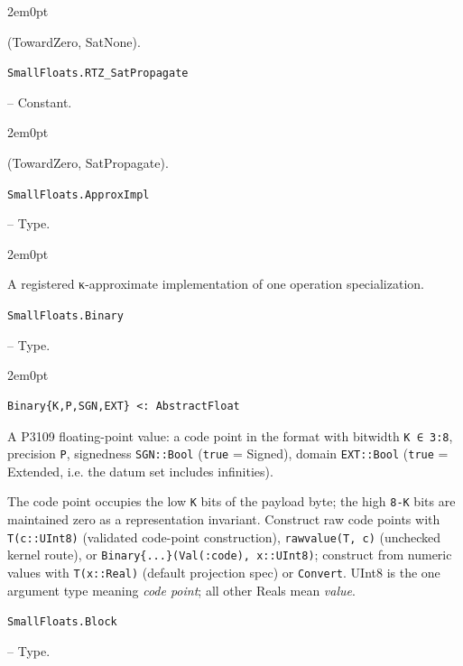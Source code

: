 \begin{adjustwidth}{2em}{0pt}

(TowardZero, SatNone).



\end{adjustwidth}
\hypertarget{11314891540121714893}{\texttt{SmallFloats.RTZ\_SatPropagate}}  -- {Constant.}

\begin{adjustwidth}{2em}{0pt}

(TowardZero, SatPropagate).



\end{adjustwidth}
\hypertarget{9201328443408064130}{\texttt{SmallFloats.ApproxImpl}}  -- {Type.}

\begin{adjustwidth}{2em}{0pt}

A registered κ-approximate implementation of one operation specialization.



\end{adjustwidth}
\hypertarget{8158499324480878091}{\texttt{SmallFloats.Binary}}  -- {Type.}

\begin{adjustwidth}{2em}{0pt}


\begin{verbatim}
Binary{K,P,SGN,EXT} <: AbstractFloat
\end{verbatim}

A P3109 floating-point value: a code point in the format with bitwidth \texttt{K ∈ 3:8}, precision \texttt{P}, signedness \texttt{SGN::Bool} (\texttt{true} = Signed), domain \texttt{EXT::Bool} (\texttt{true} = Extended, i.e. the datum set includes infinities).

The code point occupies the low \texttt{K} bits of the payload byte; the high \texttt{8-K} bits are maintained zero as a representation invariant. Construct raw code points with \texttt{T(c::UInt8)} (validated code-point construction), \texttt{rawvalue(T, c)} (unchecked kernel route), or \texttt{Binary\{...\}(Val(:code), x::UInt8)}; construct from numeric values with \texttt{T(x::Real)} (default projection spec) or \texttt{Convert}. UInt8 is the one argument type meaning \emph{code point}; all other Reals mean \emph{value}.



\end{adjustwidth}
\hypertarget{16566511736104831917}{\texttt{SmallFloats.Block}}  -- {Type.}

